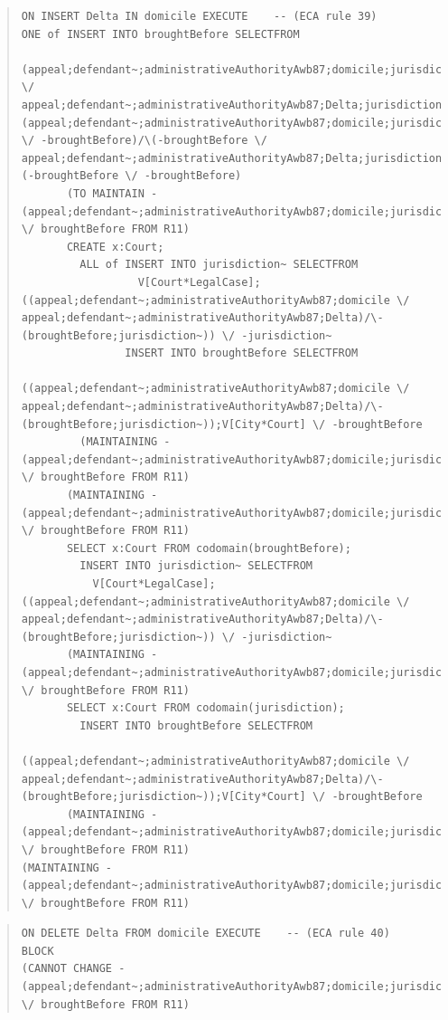 \documentclass[10pt,a4paper]{report}              %
\theoremstyle{plain}\theorembodyfont{\rmfamily}\newtheorem{definition}{Definition}[section]
\theoremstyle{plain}\theorembodyfont{\rmfamily}\newtheorem{designrule}[definition]{Requirement}
\begin{document}
\begin{quote}
\begin{verbatim}
ON INSERT Delta IN domicile EXECUTE    -- (ECA rule 39)
ONE of INSERT INTO broughtBefore SELECTFROM
         (appeal;defendant~;administrativeAuthorityAwb87;domicile;jurisdiction \/ appeal;defendant~;administrativeAuthorityAwb87;Delta;jurisdiction)/\(appeal;defendant~;administrativeAuthorityAwb87;domicile;jurisdiction \/ -broughtBefore)/\(-broughtBefore \/ appeal;defendant~;administrativeAuthorityAwb87;Delta;jurisdiction)/\(-broughtBefore \/ -broughtBefore)
       (TO MAINTAIN -(appeal;defendant~;administrativeAuthorityAwb87;domicile;jurisdiction) \/ broughtBefore FROM R11)
       CREATE x:Court;
         ALL of INSERT INTO jurisdiction~ SELECTFROM
                  V[Court*LegalCase];((appeal;defendant~;administrativeAuthorityAwb87;domicile \/ appeal;defendant~;administrativeAuthorityAwb87;Delta)/\-(broughtBefore;jurisdiction~)) \/ -jurisdiction~
                INSERT INTO broughtBefore SELECTFROM
                  ((appeal;defendant~;administrativeAuthorityAwb87;domicile \/ appeal;defendant~;administrativeAuthorityAwb87;Delta)/\-(broughtBefore;jurisdiction~));V[City*Court] \/ -broughtBefore
         (MAINTAINING -(appeal;defendant~;administrativeAuthorityAwb87;domicile;jurisdiction) \/ broughtBefore FROM R11)
       (MAINTAINING -(appeal;defendant~;administrativeAuthorityAwb87;domicile;jurisdiction) \/ broughtBefore FROM R11)
       SELECT x:Court FROM codomain(broughtBefore);
         INSERT INTO jurisdiction~ SELECTFROM
           V[Court*LegalCase];((appeal;defendant~;administrativeAuthorityAwb87;domicile \/ appeal;defendant~;administrativeAuthorityAwb87;Delta)/\-(broughtBefore;jurisdiction~)) \/ -jurisdiction~
       (MAINTAINING -(appeal;defendant~;administrativeAuthorityAwb87;domicile;jurisdiction) \/ broughtBefore FROM R11)
       SELECT x:Court FROM codomain(jurisdiction);
         INSERT INTO broughtBefore SELECTFROM
           ((appeal;defendant~;administrativeAuthorityAwb87;domicile \/ appeal;defendant~;administrativeAuthorityAwb87;Delta)/\-(broughtBefore;jurisdiction~));V[City*Court] \/ -broughtBefore
       (MAINTAINING -(appeal;defendant~;administrativeAuthorityAwb87;domicile;jurisdiction) \/ broughtBefore FROM R11)
(MAINTAINING -(appeal;defendant~;administrativeAuthorityAwb87;domicile;jurisdiction) \/ broughtBefore FROM R11)
\end{verbatim}
\end{quote}
\begin{quote}
\begin{verbatim}
ON DELETE Delta FROM domicile EXECUTE    -- (ECA rule 40)
BLOCK
(CANNOT CHANGE -(appeal;defendant~;administrativeAuthorityAwb87;domicile;jurisdiction) \/ broughtBefore FROM R11)
\end{verbatim}
\end{quote}
\end{document}
